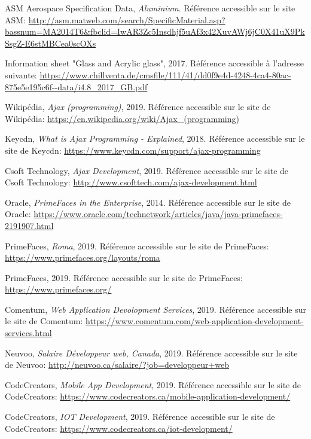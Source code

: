 \begin{thebibliographyUL}{9}
 ASM Aerospace Specification Data, \emph{Aluminium}. Référence accessible sur le site ASM: \url{http://asm.matweb.com/search/SpecificMaterial.asp?bassnum=MA2014T6&fbclid=IwAR3Zc5Insdhjf5uAf3x42XuvAWj6jC0X41uX9PkSsgZ-E6stMBCea0scOXs}

 Information sheet "Glass and Acrylic glass", 2017. Référence accessible à l'adresse suivante: \url{https://www.chillventa.de/cmsfile/111/41/dd0f9e4d-4248-4ca4-80ac-875e5e195c6f--data/i4.8_2017_GB.pdf}

 Wikipédia, \emph{Ajax (programming)}, 2019. Référence accessible sur le site de Wikipédia: \url{https://en.wikipedia.org/wiki/Ajax_(programming)}

 Keycdn, \emph{What is Ajax Programming - Explained}, 2018. Référence accessible sur le site de Keycdn: \url{https://www.keycdn.com/support/ajax-programming}

 Csoft Technology, \emph{Ajax Development}, 2019. Référence accessible sur le site de Csoft Technology: \url{http://www.csofttech.com/ajax-development.html}

 Oracle, \emph{PrimeFaces in the Enterprise}, 2014. Référence accessible sur le site de Oracle: \url{https://www.oracle.com/technetwork/articles/java/java-primefaces-2191907.html}

 PrimeFaces, \emph{Roma}, 2019. Référence accessible sur le site de PrimeFaces: \url{https://www.primefaces.org/layouts/roma}

 PrimeFaces, 2019. Référence accessible sur le site de PrimeFaces: \url{https://www.primefaces.org/}

 Comentum, \emph{Web Application Devolopment Services}, 2019. Référence accessible sur le site de Comentum: \url{https://www.comentum.com/web-application-development-services.html}

 Neuvoo, \emph{Salaire Développeur web, Canada}, 2019. Référence accessible sur le site de Neuvoo: \url{http://neuvoo.ca/salaire/?job=developpeur+web}

 CodeCreators, \emph{Mobile App Development}, 2019. Référence accessible sur le site de CodeCreators: \url{https://www.codecreators.ca/mobile-application-development/}

 CodeCreators, \emph{IOT Development}, 2019. Référence accessible sur le site de CodeCreators: \url{https://www.codecreators.ca/iot-development/}


\end{thebibliographyUL}
